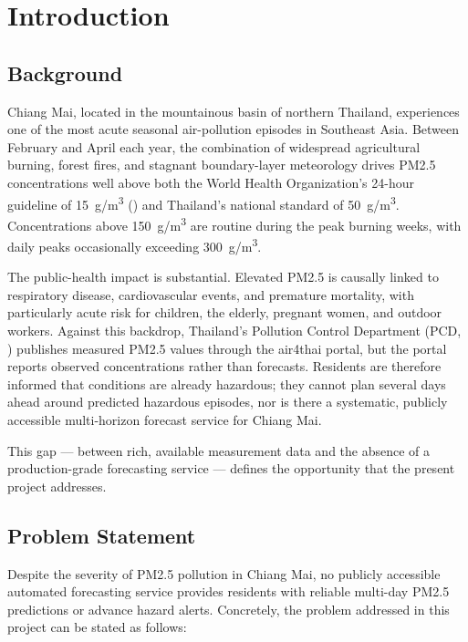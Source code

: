 \chapter{Introduction}
\label{ch:introduction}

\section{Background}

Chiang Mai, located in the mountainous basin of northern Thailand,
experiences one of the most acute seasonal air-pollution episodes in
Southeast Asia. Between February and April each year, the combination of
widespread agricultural burning, forest fires, and stagnant boundary-layer
meteorology drives PM2.5 concentrations well above both the World Health
Organization's 24-hour guideline of 15~\textmu g/m\textsuperscript{3}
(\cite{who2021}) and Thailand's national standard of
50~\textmu g/m\textsuperscript{3}. Concentrations above
150~\textmu g/m\textsuperscript{3} are routine during the peak burning weeks,
with daily peaks occasionally exceeding 300~\textmu g/m\textsuperscript{3}.

The public-health impact is substantial. Elevated PM2.5 is causally linked
to respiratory disease, cardiovascular events, and premature mortality, with
particularly acute risk for children, the elderly, pregnant women, and
outdoor workers. Against this backdrop, Thailand's Pollution Control
Department (PCD, \cite{pcd}) publishes measured PM2.5 values through the
air4thai portal, but the portal reports observed concentrations rather than
forecasts. Residents are therefore informed that conditions are already
hazardous; they cannot plan several days ahead around predicted hazardous
episodes, nor is there a systematic, publicly accessible multi-horizon
forecast service for Chiang Mai.

This gap --- between rich, available measurement data and the absence of a
production-grade forecasting service --- defines the opportunity that the
present project addresses.

\section{Problem Statement}

Despite the severity of PM2.5 pollution in Chiang Mai, no publicly
accessible automated forecasting service provides residents with reliable
multi-day PM2.5 predictions or advance hazard alerts. Concretely, the
problem addressed in this project can be stated as follows:

